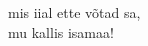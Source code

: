 \documentclass[10pt]{book}
\newenvironment{changemargin}[2]{
  \begin{list}{}{
    \setlength{\topsep}{0pt}
    \setlength{\leftmargin}{#1}
    \setlength{\rightmargin}{#2}
    \setlength{\listparindent}{\parindent}
    \setlength{\itemindent}{\parindent}
    \setlength{\parsep}{\parskip}
  }
  \item[]
}{
  \end{list}
}
\begin{document}
{\begin{changemargin}{ 0.9in }{ 0.1in }
{      \noindent \nopagebreak[4] mis iial ette võtad sa, \\
      \noindent \nopagebreak[4] mu kallis isamaa! \\
  }
  \end{changemargin}
  \pagebreak[1]
\end{document}

